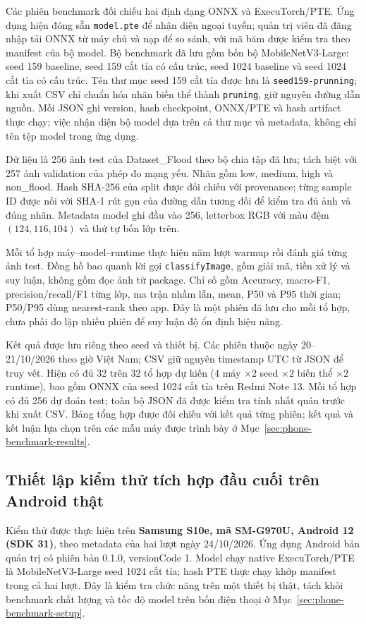 Các phiên benchmark đối chiếu hai định dạng ONNX và ExecuTorch/PTE. Ứng dụng hiện đóng sẵn \texttt{model.pte} để nhận diện ngoại tuyến; quản trị viên đã đăng nhập tải ONNX từ máy chủ và nạp để so sánh, với mã băm được kiểm tra theo manifest của bộ model. Bộ benchmark đã lưu gồm bốn bộ MobileNetV3-Large: seed 159 baseline, seed 159 cắt tỉa có cấu trúc, seed 1024 baseline và seed 1024 cắt tỉa có cấu trúc. Tên thư mục seed 159 cắt tỉa được lưu là \texttt{seed159-prunning}; khi xuất CSV chỉ chuẩn hóa nhãn biến thể thành \texttt{pruning}, giữ nguyên đường dẫn nguồn. Mỗi JSON ghi version, hash checkpoint, ONNX/PTE và hash artifact thực chạy; việc nhận diện bộ model dựa trên cả thư mục và metadata, không chỉ tên tệp model trong ứng dụng.

Dữ liệu là 256 ảnh test của Dataset\_Flood theo bộ chia tập đã lưu; tách biệt với 257 ảnh validation của phép đo mạng yếu. Nhãn gồm low, medium, high và non\_flood. Hash SHA-256 của split được đối chiếu với provenance; từng sample ID được nối với SHA-1 rút gọn của đường dẫn tương đối để kiểm tra đủ ảnh và đúng nhãn. Metadata model ghi đầu vào 256, letterbox RGB với màu đệm $(124,116,104)$ và thứ tự bốn lớp trên.

Mỗi tổ hợp máy--model--runtime thực hiện năm lượt warmup rồi đánh giá từng ảnh test. Đồng hồ bao quanh lời gọi \texttt{classifyImage}, gồm giải mã, tiền xử lý và suy luận, không gồm đọc ảnh từ package. Chỉ số gồm Accuracy, macro-F1, precision/recall/F1 từng lớp, ma trận nhầm lẫn, mean, P50 và P95 thời gian; P50/P95 dùng nearest-rank theo app. Đây là một phiên đã lưu cho mỗi tổ hợp, chưa phải đo lặp nhiều phiên để suy luận độ ổn định hiệu năng.

Kết quả được lưu riêng theo seed và thiết bị. Các phiên thuộc ngày 20--21/10/2026 theo giờ Việt Nam; CSV giữ nguyên timestamp UTC từ JSON để truy vết. Hiện có đủ 32 trên 32 tổ hợp dự kiến ($4$ máy $\times 2$ seed $\times 2$ biến thể $\times 2$ runtime), bao gồm ONNX của seed 1024 cắt tỉa trên Redmi Note 13. Mỗi tổ hợp có đủ 256 dự đoán test; toàn bộ JSON đã được kiểm tra tính nhất quán trước khi xuất CSV. Bảng tổng hợp được đối chiếu với kết quả từng phiên; kết quả và kết luận lựa chọn trên các mẫu máy được trình bày ở Mục~\ref{sec:phone-benchmark-results}.

\subsection{Thiết lập kiểm thử tích hợp đầu cuối trên Android thật}\label{sec:mobile-system-setup}
Kiểm thử được thực hiện trên \textbf{Samsung S10e, mã SM-G970U, Android 12 (SDK 31)}, theo metadata của hai lượt ngày 24/10/2026. Ứng dụng Android bản quản trị có phiên bản 0.1.0, versionCode 1. Model chạy native ExecuTorch/PTE là MobileNetV3-Large seed 1024 cắt tỉa; hash PTE thực chạy khớp manifest trong cả hai lượt. Đây là kiểm tra chức năng trên một thiết bị thật, tách khỏi benchmark chất lượng và tốc độ model trên bốn điện thoại ở Mục~\ref{sec:phone-benchmark-setup}.

